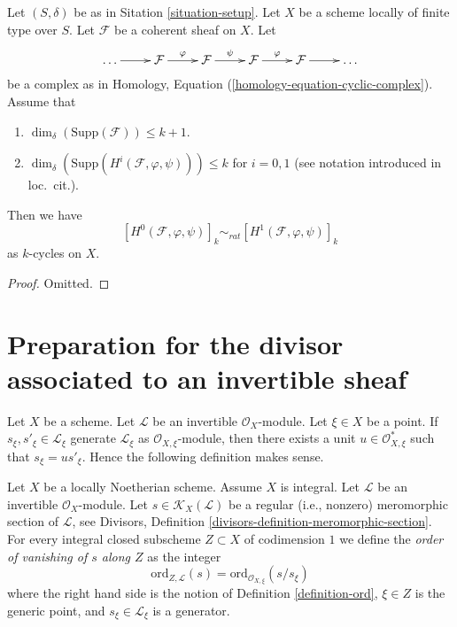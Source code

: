 \begin{lemma}
\label{lemma-maps-between-coherent-sheaves}
Let $(S, \delta)$ be as in Sitation \ref{situation-setup}.
Let $X$ be a scheme locally of finite type over $S$.
Let $\mathcal{F}$ be a coherent sheaf on $X$.
Let 
$$
\xymatrix{
\ldots \ar[r] &
\mathcal{F} \ar[r]^\varphi &
\mathcal{F} \ar[r]^\psi &
\mathcal{F} \ar[r]^\varphi &
\mathcal{F} \ar[r] & \ldots
}
$$
be a complex as in
Homology, Equation (\ref{homology-equation-cyclic-complex}). Assume that
\begin{enumerate}
\item $\dim_\delta(\text{Supp}(\mathcal{F})) \leq k + 1$.
\item $\dim_\delta(\text{Supp}(H^i(\mathcal{F}, \varphi, \psi))) \leq k$
for $i = 0, 1$ (see notation introduced in loc.\ cit.).
\end{enumerate}
Then we have
$$
[H^0(\mathcal{F}, \varphi, \psi)]_k
\sim_{rat}
[H^1(\mathcal{F}, \varphi, \psi)]_k
$$
as $k$-cycles on $X$.
\end{lemma}

\begin{proof}
Omitted.
\end{proof}








\section{Preparation for the divisor associated to an invertible sheaf}
\label{section-preparation-divisor-sheaf}

\noindent
Let $X$ be a scheme.
Let $\mathcal{L}$ be an invertible $\mathcal{O}_X$-module.
Let $\xi \in X$ be a point.
If $s_\xi, s'_\xi \in \mathcal{L}_\xi$ generate $\mathcal{L}_\xi$
as $\mathcal{O}_{X, \xi}$-module, then there exists a unit
$u \in \mathcal{O}_{X, \xi}^*$ such that $s_\xi = u s'_\xi$.
Hence the following definition makes sense.

\begin{definition}
\label{definition-order-vanishing-meromorphic}
Let $X$ be a locally Noetherian scheme. Assume $X$ is integral.
Let $\mathcal{L}$ be an invertible $\mathcal{O}_X$-module.
Let $s \in \mathcal{K}_X(\mathcal{L})$ be a regular (i.e., nonzero)
meromorphic section of $\mathcal{L}$, see
Divisors, Definition \ref{divisors-definition-meromorphic-section}.
For every integral closed subscheme
$Z \subset X$ of codimension $1$ we define
the {\it order of vanishing of $s$ along $Z$} as the integer
$$
\text{ord}_{Z, \mathcal{L}}(s)
= \text{ord}_{\mathcal{O}_{X, \xi}}(s/s_\xi)
$$
where the right hand side is the notion of
Definition \ref{definition-ord}, $\xi \in Z$ is the generic point,
and $s_\xi \in \mathcal{L}_\xi$ is a generator.
\end{definition}

